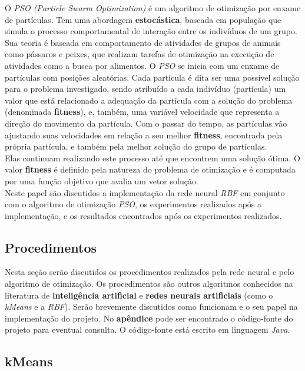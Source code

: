 \documentclass[10pt,twocolumn,letterpaper]{article}
\begin{document}
O \textit{PSO (Particle Swarm Optimization)} é um algoritmo de otimização por enxame de partículas. Tem uma abordagem \textbf{estocástica}, baseada em população que simula o processo comportamental de interação entre os indivíduos de um grupo. Sua teoria é baseada em comportamento de atividades de grupos de animais como pássaros e peixes, que realizam tarefas de otimização na execução de atividades como a busca por alimentos. O \textit{PSO} se inicia com um enxame de partículas com posições aleatórias. Cada partícula é dita ser uma possível solução para o problema investigado, sendo atribuído a cada indivíduo (partícula) um valor que está relacionado a adequação da partícula com a solução do problema (denominada \textbf{fitness}), e, também, uma variável velocidade que representa a direção do movimento da partícula. Com o passar do tempo, as partículas vão ajustando suas velocidades em relação a seu melhor \textbf{fitness}, encontrada pela própria partícula, e também pela melhor solução do grupo de partículas.\\ Elas continuam realizando este processo até que encontrem uma solução ótima. O valor \textbf{fitness} é definido pela natureza do problema de otimização e é computada por uma função objetivo que avalia um vetor solução. \\

Neste papel são discutidos a implementação da rede neural \textit{RBF} em conjunto com o algoritmo de otimização \textit{PSO}, os experimentos realizados após a implementação, e os resultados encontrados após os experimentos realizados.


\subsection{Procedimentos}
Nesta seção serão discutidos os procedimentos realizados pela rede neural e pelo algoritmo de otimização. Os procedimentos são outros algoritmos conhecidos na literatura de \textbf{inteligência artificial} e \textbf{redes neurais artificiais} (como o \textit{kMeans} e a \textit{RBF}). Serão brevemente discutidos como funcionam e o seu papel na implementação do projeto. No \textbf{apêndice} pode ser encontrado o código-fonte do projeto para eventual consulta. O código-fonte está escrito em linguagem \textit{Java}.

\subsection{kMeans}
\end{document}
